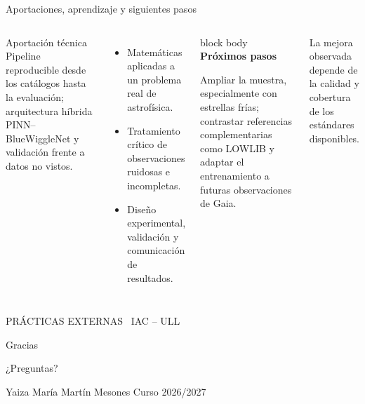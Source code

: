\documentclass[aspectratio=169,10pt]{beamer}
\begin{document}
\begin{frame}{Aportaciones, aprendizaje y siguientes pasos}
  \begin{columns}[T,onlytextwidth]
      \begin{block}{Aportación técnica}
        Pipeline reproducible desde los catálogos hasta la evaluación;
        arquitectura híbrida PINN--BlueWiggleNet y validación frente a
        datos no vistos.
      \end{block}
      \begin{itemize}
        \item Matemáticas aplicadas a un problema real de astrofísica.
        \item Tratamiento crítico de observaciones ruidosas e incompletas.
        \item Diseño experimental, validación y comunicación de resultados.
      \end{itemize}
      \begin{beamercolorbox}[wd=\linewidth,sep=0.85em,rounded=true]{block body}
        {\color{ULLNavy}\bfseries Próximos pasos}\par\vspace{0.35em}
        Ampliar la muestra, especialmente con estrellas frías; contrastar
        referencias complementarias como LOWLIB y adaptar el entrenamiento
        a futuras observaciones de Gaia.
      \end{beamercolorbox}
      \vspace{0.65em}
      {\small\color{Muted}La mejora observada depende de la calidad y cobertura
      de los estándares disponibles.}
  \end{columns}
\end{frame}

\begin{frame}[plain]
  \vfill
  \centering
  {\color{ULLGold}\Large PRÁCTICAS EXTERNAS \textbar\ IAC -- ULL\par}
  \vspace{0.9cm}
  {\color{white}\Huge Gracias\par}
  \vspace{0.35cm}
  {\color{white!82}\Large ¿Preguntas?\par}
  \vfill
  {\color{white!70}\small Yaiza María Martín Mesones \hfill Curso 2026/2027\par}
  \vspace{0.5cm}
\end{frame}
\end{document}
